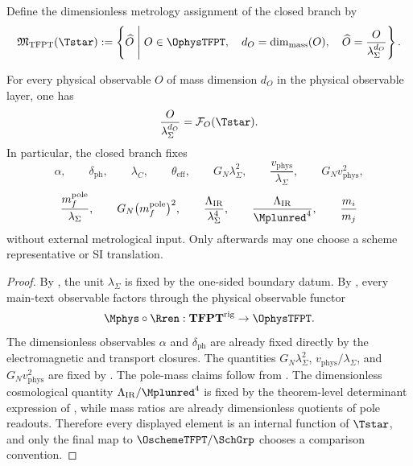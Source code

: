 \begin{definition}
\label{def:tfpt-metrology-functor}
Define the dimensionless metrology assignment of the closed branch by
\[
\mathfrak M_{\mathrm{TFPT}}(\Tstar)
:=
\left\{
\widehat O \;\middle|\;
O\in\OphysTFPT,\quad
d_O=\dim_{\mathrm{mass}}(O),\quad
\widehat O=\frac{O}{\lambda_\Sigma^{d_O}}
\right\}.
\]
\end{definition}

\begin{theorem}
\label{thm:dimensionless-tfpt-metrology}
For every physical observable $O$ of mass dimension $d_O$ in the physical observable layer, one has
\[
\frac{O}{\lambda_\Sigma^{d_O}}
=
\mathcal F_O(\Tstar).
\]
In particular, the closed branch fixes
\[
\alpha,
\qquad
\delta_{\mathrm{ph}},
\qquad
\lambda_C,
\qquad
\theta_{\mathrm{eff}},
\qquad
G_N\lambda_\Sigma^2,
\qquad
\frac{v_{\mathrm{phys}}}{\lambda_\Sigma},
\qquad
G_Nv_{\mathrm{phys}}^2,
\]
\[
\frac{m_f^{\mathrm{pole}}}{\lambda_\Sigma},
\qquad
G_N\bigl(m_f^{\mathrm{pole}}\bigr)^2,
\qquad
\frac{\Lambda_{\mathrm{IR}}}{\lambda_\Sigma^4},
\qquad
\frac{\Lambda_{\mathrm{IR}}}{\Mplunred^4},
\qquad
\frac{m_i}{m_j}
\]
without external metrological input. Only afterwards may one choose a scheme representative or SI
translation.
\end{theorem}

\begin{proof}
By , the unit $\lambda_\Sigma$ is fixed by the one-sided
boundary datum. By , every main-text observable factors through
the physical observable functor
\[
\Mphys\circ\Rren:\mathbf{TFPT}^{\mathrm{rig}}\to\OphysTFPT.
\]
The dimensionless observables $\alpha$ and $\delta_{\mathrm{ph}}$ are already fixed directly by the
electromagnetic and transport closures. The quantities
$G_N\lambda_\Sigma^2$, $v_{\mathrm{phys}}/\lambda_\Sigma$, and
$G_Nv_{\mathrm{phys}}^2$ are fixed by
. The pole-mass
claims follow from . The dimensionless cosmological
quantity $\Lambda_{\mathrm{IR}}/\Mplunred^4$ is fixed by the theorem-level determinant expression of
, while mass ratios are already dimensionless quotients of pole
readouts. Therefore every displayed element is an internal function of $\Tstar$, and only the final
map to $\OschemeTFPT/\SchGrp$ chooses a comparison convention.
\end{proof}


